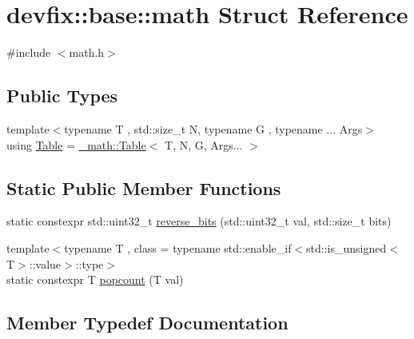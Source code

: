 \hypertarget{structdevfix_1_1base_1_1math}{}\section{devfix\+:\+:base\+:\+:math Struct Reference}
\label{structdevfix_1_1base_1_1math}


{\ttfamily \#include $<$math.\+h$>$}

\subsection*{Public Types}
\begin{DoxyCompactItemize}
\item 
{\footnotesize template$<$typename T , std\+::size\+\_\+t N, typename G , typename ... Args$>$ }\\using \hyperlink{structdevfix_1_1base_1_1math_a6f2114ac2cf825b518cf5fefa00af6e3}{Table} = \hyperlink{structdevfix_1_1base_1_1__math_1_1Table}{\+\_\+math\+::\+Table}$<$ T, N, G, Args... $>$
\end{DoxyCompactItemize}
\subsection*{Static Public Member Functions}
\begin{DoxyCompactItemize}
\item 
static constexpr std\+::uint32\+\_\+t \hyperlink{structdevfix_1_1base_1_1math_af3260ac1a62b3e9f6feb0f212aa8f796}{reverse\+\_\+bits} (std\+::uint32\+\_\+t val, std\+::size\+\_\+t bits)
\item 
{\footnotesize template$<$typename T , class  = typename std\+::enable\+\_\+if$<$std\+::is\+\_\+unsigned$<$\+T$>$\+::value$>$\+::type$>$ }\\static constexpr T \hyperlink{structdevfix_1_1base_1_1math_a43815037f45e01d90a6c0cb0e1d8ef11}{popcount} (T val)
\end{DoxyCompactItemize}


\subsection{Member Typedef Documentation}
\mbox{\label{structdevfix_1_1base_1_1math_a6f2114ac2cf825b518cf5fefa00af6e3}} 
